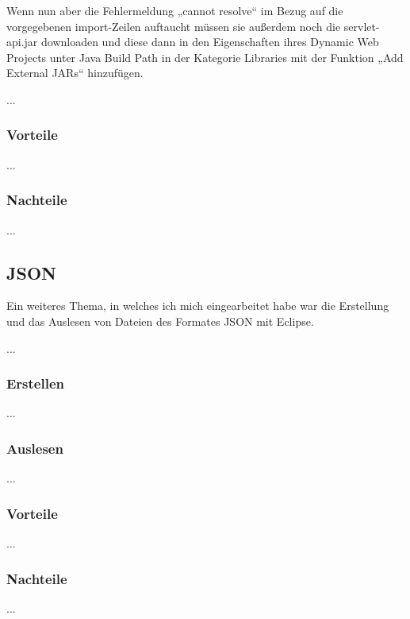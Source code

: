 \documentclass[12pt,a4paper,bibliography=totocnumbered,listof=totocnumbered]{scrartcl}
\begin{document}
Wenn nun aber die Fehlermeldung  „cannot resolve“ im Bezug auf die vorgegebenen import-Zeilen auftaucht müssen sie außerdem noch die servlet-api.jar downloaden und diese dann in den Eigenschaften ihres Dynamic Web Projects unter Java Build Path in der Kategorie Libraries mit der Funktion „Add External JARs“ hinzufügen. 

...

\subsubsection{Vorteile}
...
\subsubsection{Nachteile}
...

\subsection{JSON}
Ein weiteres Thema, in welches ich mich eingearbeitet habe war die Erstellung und das Auslesen von Dateien
des Formates JSON mit Eclipse.

...

\subsubsection{Erstellen}
...
\subsubsection{Auslesen}
...
\subsubsection{Vorteile}
...
\subsubsection{Nachteile}
...
\end{document}
